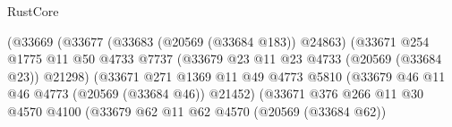 \begin{lexlean}{RustCore}
\begin{coremodule}
                                            (@33669
                                              (@33677
                                                (@33683 (@20569 (@33684 @183)) @24863)
                                                (@33671
                                                  @254
                                                  @1775
                                                  @11
                                                  @50
                                                  @4733
                                                  @7737
                                                  (@33679
                                                    @23
                                                    @11
                                                    @23
                                                    @4733
                                                    (@20569 (@33684 @23))
                                                    @21298)
                                                  (@33671
                                                    @271
                                                    @1369
                                                    @11
                                                    @49
                                                    @4773
                                                    @5810
                                                    (@33679
                                                      @46
                                                      @11
                                                      @46
                                                      @4773
                                                      (@20569 (@33684 @46))
                                                      @21452)
                                                    (@33671
                                                      @376
                                                      @266
                                                      @11
                                                      @30
                                                      @4570
                                                      @4100
                                                      (@33679
                                                        @62
                                                        @11
                                                        @62
                                                        @4570
                                                        (@20569 (@33684 @62))

\end{coremodule}
\end{lexlean}
